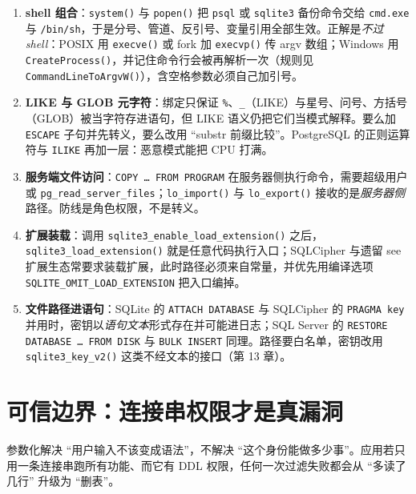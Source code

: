 \documentclass[12pt,a4paper,fontset=fandol]{ctexbook}
\newcommand{\Fn}[1]{\texttt{#1()}}
\newcommand{\Tp}[1]{\texttt{#1}}
\begin{document}
\begin{warning}[title=五个非 SQL 注入面与其防线]
\begin{enumerate}
  \item \textbf{shell 组合}：\Fn{system} 与 \Fn{popen} 把 \Tp{psql} 或 \Tp{sqlite3} 备份命令交给 \Tp{cmd.exe} 与 \Tp{/bin/sh}，于是分号、管道、反引号、变量引用全部生效。正解是\emph{不过 shell}：POSIX 用 \Fn{execve} 或 fork 加 \Fn{execvp} 传 argv 数组；Windows 用 \Fn{Create\allowbreak Process}，并记住命令行会被再解析一次（规则见 \Fn{CommandLine\allowbreak ToArgvW}），含空格参数必须自己加引号。
  \item \textbf{LIKE 与 GLOB 元字符}：绑定只保证 \texttt{\%}、\texttt{\_}（LIKE）与星号、问号、方括号（GLOB）被当字符存进语句，但 LIKE 语义仍把它们当模式解释。要么加 \texttt{ESCAPE} 子句并先转义，要么改用 ``substr 前缀比较''。PostgreSQL 的正则运算符与 \texttt{ILIKE} 再加一层：恶意模式能把 CPU 打满。
  \item \textbf{服务端文件访问}：\texttt{COPY \ldots{} FROM PROGRAM} 在服务器侧执行命令，需要超级用户或 \Tp{pg\_read\_server\_files}；\Fn{lo\_import} 与 \Fn{lo\_export} 接收的是\emph{服务器侧}路径。防线是角色权限，不是转义。
  \item \textbf{扩展装载}：调用 \Fn{sqlite3\_\allowbreak{}enable\_\allowbreak{}load\_\allowbreak{}extension} 之后，\Fn{sqlite3\_\allowbreak{}load\_\allowbreak{}extension} 就是任意代码执行入口；SQLCipher 与遗留 see 扩展生态常要求装载扩展，此时路径必须来自常量，并优先用编译选项 \Tp{SQLITE\_\allowbreak{}OMIT\_\allowbreak{}LOAD\_\allowbreak{}\allowbreak EXTENSION} 把入口编掉。
  \item \textbf{文件路径进语句}：SQLite 的 \texttt{ATTACH DATABASE} 与 SQLCipher 的 \texttt{PRAGMA key} 并用时，密钥以\emph{语句文本}形式存在并可能进日志；SQL Server 的 \texttt{RESTORE DATABASE \ldots{} FROM DISK} 与 \texttt{BULK INSERT} 同理。路径要白名单，密钥改用 \Fn{sqlite3\_\allowbreak{}key\_\allowbreak{}v2} 这类不经文本的接口（第 13 章）。
\end{enumerate}
\end{warning}

\section{可信边界：连接串权限才是真漏洞}

参数化解决 ``用户输入不该变成语法''，不解决 ``这个身份能做多少事''。应用若只用一条连接串跑所有功能、而它有 DDL 权限，任何一次过滤失败都会从 ``多读了几行'' 升级为 ``删表''。
\end{document}
